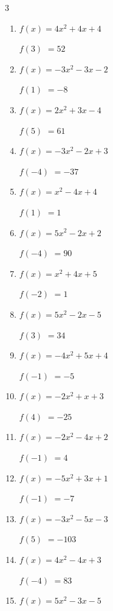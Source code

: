 \begin{multicols}{3}
\begin{enumerate}
$f(1)$
        $= -9$

\columnbreak %

\resetques

  \item $f(x)=4x^{2}+4x+4$

$f(3)$
        $= 52$

  \item $f(x)=-3x^{2}-3x-2$

$f(1)$
        $= -8$

  \item $f(x)=2x^{2}+3x-4$

$f(5)$
        $= 61$

  \item $f(x)=-3x^{2}-2x+3$

$f(-4)$
        $= -37$

  \item $f(x)=x^{2}-4x+4$

$f(1)$
        $= 1$

  \item $f(x)=5x^{2}-2x+2$

$f(-4)$
        $= 90$

  \item $f(x)=x^{2}+4x+5$

$f(-2)$
        $= 1$

  \item $f(x)=5x^{2}-2x-5$

$f(3)$
        $= 34$

  \item $f(x)=-4x^{2}+5x+4$

$f(-1)$
        $= -5$

  \item $f(x)=-2x^{2}+x+3$

$f(4)$
        $= -25$

  \item $f(x)=-2x^{2}-4x+2$

$f(-1)$
        $= 4$

  \item $f(x)=-5x^{2}+3x+1$

$f(-1)$
        $= -7$

  \item $f(x)=-3x^{2}-5x-3$

$f(5)$
        $= -103$

  \item $f(x)=4x^{2}-4x+3$

$f(-4)$
        $= 83$

  \item $f(x)=5x^{2}-3x-5$


\end{enumerate}
\end{multicols}
